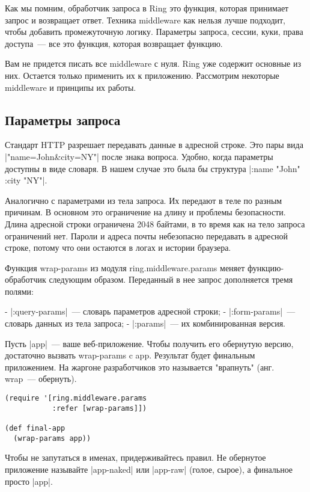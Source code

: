 Как мы помним, обработчик запроса в Ring это функция, которая принимает запрос и
возвращает ответ. Техника middleware как нельзя лучше подходит, чтобы добавить
промежуточную логику. Параметры запроса, сессии, куки, права доступа~--- все это
функция, которая возвращает функцию.

Вам не придется писать все middleware с нуля. Ring уже содержит основные из
них. Остается только применить их к приложению. Рассмотрим некоторые middleware
и принципы их работы.

\subsection{Параметры запроса}

Стандарт HTTP разрешает передавать данные в адресной строке. Это пары вида
\spverb|"name=John&city=NY"| после знака вопроса. Удобно, когда параметры доступны в виде
словаря. В нашем случае это была бы структура \spverb|{:name "John" :city "NY"}|.

Аналогично с параметрами из тела запроса. Их передают в теле по разным
причинам. В основном это ограничение на длину и проблемы безопасности. Длина
адресной строки ограничена 2048 байтами, в то время как на тело запроса
ограничений нет. Пароли и адреса почты небезопасно передавать в адресной строке,
потому что они остаются в логах и истории браузера.

Функция wrap-params из модуля ring.middleware.params меняет функцию-обработчик
следующим образом. Переданный в нее запрос дополняется тремя полями:

- \spverb|:query-params|~--- словарь параметров адресной строки;
- \spverb|:form-params|~--- словарь данных из тела запроса;
- \spverb|:params|~--- их комбинированная версия.

Пусть \spverb|app|~--- ваше веб-приложение. Чтобы получить его обернутую версию,
достаточно вызвать wrap-params c app. Результат будет финальным приложением. На
жаргоне разработчиков это называется "врапнуть" (анг. wrap~--- обернуть).

\begin{verbatim}
(require '[ring.middleware.params
           :refer [wrap-params]])

(def final-app
  (wrap-params app))
\end{verbatim}

Чтобы не запутаться в именах, придерживайтесь правил. Не обернутое приложение
называйте \spverb|app-naked| или \spverb|app-raw| (голое, сырое), а финальное просто \spverb|app|.

